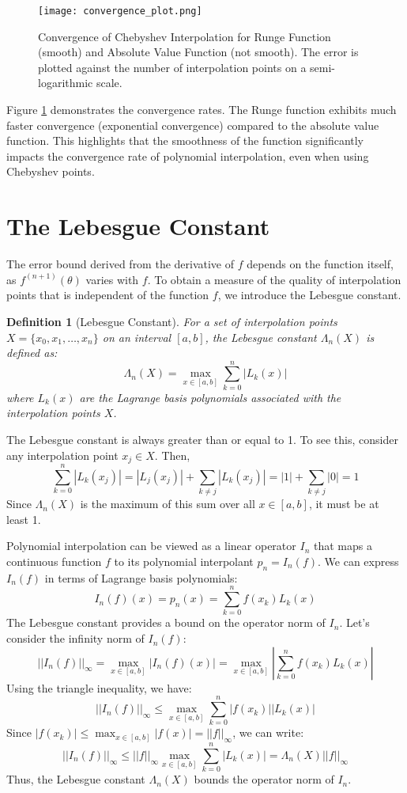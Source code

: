 \documentclass{article}
\newtheorem{definition}{Definition}
\begin{document}
\begin{figure}[H]
    \centering
    \texttt{[image: convergence\_plot.png]}
    \caption{Convergence of Chebyshev Interpolation for Runge Function (smooth) and Absolute Value Function (not smooth). The error is plotted against the number of interpolation points on a semi-logarithmic scale.}
    \label{fig:convergence_comparison}
\end{figure}

Figure \ref{fig:convergence_comparison} demonstrates the convergence rates.  The Runge function exhibits much faster convergence (exponential convergence) compared to the absolute value function.  This highlights that the smoothness of the function significantly impacts the convergence rate of polynomial interpolation, even when using Chebyshev points.

\section{The Lebesgue Constant}

The error bound derived from the derivative of $f$ depends on the function itself, as $f^{(n+1)}(\theta)$ varies with $f$.  To obtain a measure of the quality of interpolation points that is independent of the function $f$, we introduce the Lebesgue constant.

\begin{definition}[Lebesgue Constant]
For a set of interpolation points $X = \{x_0, x_1, \dots, x_n\}$ on an interval $[a, b]$, the Lebesgue constant $\Lambda_n(X)$ is defined as:
\[
\Lambda_n(X) = \max_{x \in [a,b]} \sum_{k=0}^{n} |L_k(x)|
\]
where $L_k(x)$ are the Lagrange basis polynomials associated with the interpolation points $X$.
\end{definition}

The Lebesgue constant is always greater than or equal to 1. To see this, consider any interpolation point $x_j \in X$. Then,
\[
\sum_{k=0}^{n} |L_k(x_j)| = |L_j(x_j)| + \sum_{k \neq j} |L_k(x_j)| = |1| + \sum_{k \neq j} |0| = 1
\]
Since $\Lambda_n(X)$ is the maximum of this sum over all $x \in [a, b]$, it must be at least 1.

Polynomial interpolation can be viewed as a linear operator $I_n$ that maps a continuous function $f$ to its polynomial interpolant $p_n = I_n(f)$. We can express $I_n(f)$ in terms of Lagrange basis polynomials:
\[
I_n(f)(x) = p_n(x) = \sum_{k=0}^{n} f(x_k) L_k(x)
\]
The Lebesgue constant provides a bound on the operator norm of $I_n$. Let's consider the infinity norm of $I_n(f)$:
\[
||I_n(f)||_{\infty} = \max_{x \in [a,b]} |I_n(f)(x)| = \max_{x \in [a,b]} \left| \sum_{k=0}^{n} f(x_k) L_k(x) \right|
\]
Using the triangle inequality, we have:
\[
||I_n(f)||_{\infty} \leq \max_{x \in [a,b]} \sum_{k=0}^{n} |f(x_k)| |L_k(x)|
\]
Since $|f(x_k)| \leq \max_{x \in [a,b]} |f(x)| = ||f||_{\infty}$, we can write:
\[
||I_n(f)||_{\infty} \leq ||f||_{\infty} \max_{x \in [a,b]} \sum_{k=0}^{n} |L_k(x)| = \Lambda_n(X) ||f||_{\infty}
\]
Thus, the Lebesgue constant $\Lambda_n(X)$ bounds the operator norm of $I_n$.
\end{document}
